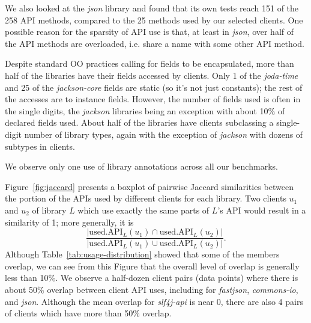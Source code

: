 We also looked at the \emph{json} library and found that its own tests reach 151
of the 258 API methods, compared to the 25 methods used by our selected
clients. One possible reason for the sparsity of API use is that, at least in \emph{json}, over half of the API methods are overloaded, i.e. share a name with
some other API method.


Despite standard OO practices calling for fields to be encapsulated, more than half of the libraries have their fields accessed by clients. Only 1 of the \emph{joda-time} and 25 of the \emph{jackson-core} fields are static (so it's not just constants); the rest of the accesses are to instance fields.
However, the number of fields used is often in the single digits,
the \emph{jackson} libraries being an exception with about 10\% of declared fields used.
About half of the libraries have clients subclassing a
single-digit number of library types, again with the exception of
\emph{jackson} with dozens of subtypes in clients.

We observe only one use of library annotations across all our benchmarks. %

Figure~\ref{fig:jaccard} presents a boxplot of
pairwise Jaccard similarities between the portion of
the APIs used by different clients for each library. Two clients $u_1$ and $u_2$ 
of library $L$ which use exactly the same parts of $L$'s API would result in a similarity of 1;
more generally, it is
\[ \frac{|\mbox{used.API}_L(u_1) \cap \mbox{used.API}_L(u_2)|}{|\mbox{used.API}_L(u_1) \cup \mbox{used.API}_L(u_2)|}. \]
Although Table~\ref{tab:usage-distribution} showed that some of the members overlap, we can
see from this Figure that the overall level of overlap is generally less than 10\%. We observe
a half-dozen client pairs (data points) where there is about 50\% overlap between client API uses, including for \emph{fastjson},
\emph{commons-io}, and \emph{json}. Although the mean overlap for \emph{slf4j-api} is near 0, there are also 4 pairs of clients which have more than 50\% overlap.

